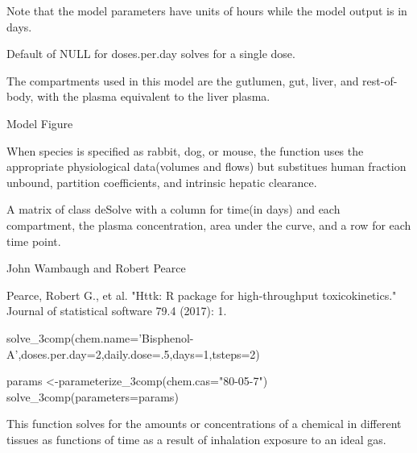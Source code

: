 \documentclass[a4paper]{book}
\begin{document}
%
\begin{Details}\relax
Note that the model parameters have units of hours while the model output is
in days.

Default of NULL for doses.per.day solves for a single dose.

The compartments used in this model are the gutlumen, gut, liver, and
rest-of-body, with the plasma equivalent to the liver plasma.

Model Figure 
 

When species is specified as rabbit, dog, or mouse, the function uses the
appropriate physiological data(volumes and flows) but substitues human
fraction unbound, partition coefficients, and intrinsic hepatic clearance.
\end{Details}
%
\begin{Value}
A matrix of class deSolve with a column for time(in days) and each
compartment, the plasma concentration, area under the curve, and a row for
each time point.
\end{Value}
%
\begin{Author}\relax
John Wambaugh and Robert Pearce
\end{Author}
%
\begin{References}\relax
Pearce, Robert G., et al. "Httk: R package for high-throughput
toxicokinetics." Journal of statistical software 79.4 (2017): 1.
\end{References}
%
\begin{Examples}
\begin{ExampleCode}

solve_3comp(chem.name='Bisphenol-A',doses.per.day=2,daily.dose=.5,days=1,tsteps=2)

params <-parameterize_3comp(chem.cas="80-05-7")
solve_3comp(parameters=params)

\end{ExampleCode}
\end{Examples}
\graphicspath{{"C:/Users/jwambaug/git/httk/httk/man/figures/"}}
%
\begin{Description}\relax
This function solves for the amounts or concentrations of a chemical
in different tissues as functions of time as a result of inhalation 
exposure to an ideal gas.
\end{Description}
%
\end{document}
